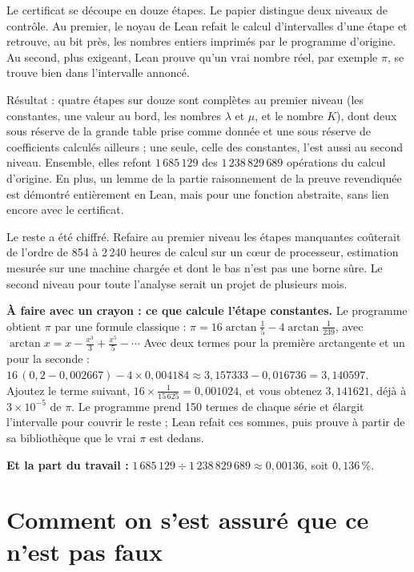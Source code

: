 Le certificat se découpe en douze étapes. Le papier distingue deux niveaux de contrôle. Au
premier, le noyau de Lean refait le calcul d'intervalles d'une étape et retrouve, au bit près,
les nombres entiers imprimés par le programme d'origine. Au second, plus exigeant, Lean prouve
qu'un vrai nombre réel, par exemple $\pi$, se trouve bien dans l'intervalle annoncé.

Résultat : quatre étapes sur douze sont complètes au premier niveau (les constantes, une valeur
au bord, les nombres $\lambda$ et $\mu$, et le nombre $K$), dont deux sous réserve de la grande
table prise comme donnée et une sous réserve de coefficients calculés ailleurs ; une seule, celle des constantes, l'est aussi au second niveau.
Ensemble, elles refont $1\,685\,129$ des $1\,238\,829\,689$ opérations du calcul d'origine. En
plus, un lemme de la partie \og raisonnement\fg{} de la preuve revendiquée est démontré
entièrement en Lean, mais pour une fonction abstraite, sans lien encore avec le certificat.

Le reste a été chiffré. Refaire au premier niveau les étapes manquantes coûterait de l'ordre de
854 à 2\,240 heures de calcul sur un cœur de processeur, estimation mesurée sur une machine
chargée et dont le bas n'est pas une borne sûre. Le second niveau pour toute l'analyse serait un
projet de plusieurs mois.

\begin{encadre}
\textbf{À faire avec un crayon : ce que calcule l'étape \og constantes\fg{}.} Le programme obtient $\pi$ par
une formule classique :
$\pi=16\arctan\tfrac15-4\arctan\tfrac1{239}$, avec
$\arctan x=x-\tfrac{x^3}{3}+\tfrac{x^5}{5}-\cdots$
Avec deux termes pour la première arctangente et un pour la seconde :
$16\,(0{,}2-0{,}002667)-4\times0{,}004184\approx3{,}157333-0{,}016736=3{,}140597$.
Ajoutez le terme suivant, $16\times\tfrac{1}{15\,625}=0{,}001024$, et vous obtenez $3{,}141621$,
déjà à $3\times10^{-5}$ de $\pi$. Le programme prend 150 termes de chaque série et élargit
l'intervalle pour couvrir le reste ; Lean refait ces sommes, puis prouve à partir de sa
bibliothèque que le vrai $\pi$ est dedans.

\textbf{Et la part du travail :} $1\,685\,129\div1\,238\,829\,689\approx0{,}00136$, soit
$0{,}136\,\%$.
\end{encadre}

\section*{Comment on s'est assuré que ce n'est pas faux}

